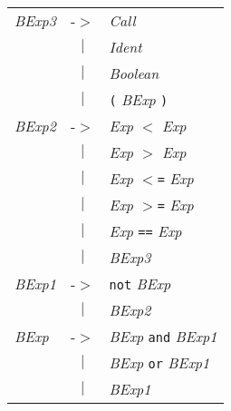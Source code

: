 \documentclass{article}
\begin{document}
\begin{tabular}{lll}
\textit{BExp3} & -$>$ & \textit{Call} \\
 & \multicolumn{1}{c}{\textbf{$|$}} & \textit{Ident} \\
 & \multicolumn{1}{c}{\textbf{$|$}} & \textit{Boolean} \\
 & \multicolumn{1}{c}{\textbf{$|$}} & \texttt{(} \textit{BExp} \texttt{)} \\
\textit{BExp2} & -$>$ & \textit{Exp} \texttt{$<$} \textit{Exp} \\
 & \multicolumn{1}{c}{\textbf{$|$}} & \textit{Exp} \texttt{$>$} \textit{Exp} \\
 & \multicolumn{1}{c}{\textbf{$|$}} & \textit{Exp} \texttt{$<$=} \textit{Exp} \\
 & \multicolumn{1}{c}{\textbf{$|$}} & \textit{Exp} \texttt{$>$=} \textit{Exp} \\
 & \multicolumn{1}{c}{\textbf{$|$}} & \textit{Exp} \texttt{==} \textit{Exp} \\
 & \multicolumn{1}{c}{\textbf{$|$}} & \textit{BExp3} \\
\textit{BExp1} & -$>$ & \texttt{not} \textit{BExp} \\
 & \multicolumn{1}{c}{\textbf{$|$}} & \textit{BExp2} \\
\textit{BExp} & -$>$ & \textit{BExp} \texttt{and} \textit{BExp1} \\
 & \multicolumn{1}{c}{\textbf{$|$}} & \textit{BExp} \texttt{or} \textit{BExp1} \\
 & \multicolumn{1}{c}{\textbf{$|$}} & \textit{BExp1} \\
\end{tabular}
\end{document}
